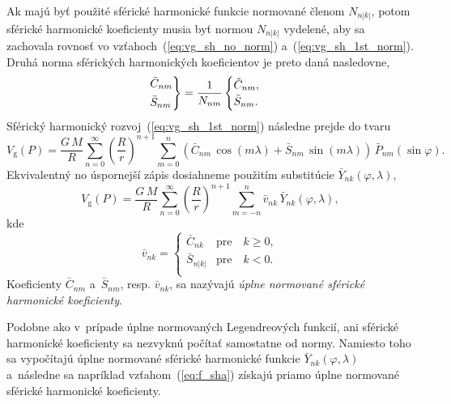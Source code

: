 \documentclass[a4paper, 12pt]{book}
\newcommand{\gidx}{\mathrm g}
\begin{document}
Ak majú byť použité sférické harmonické funkcie normované členom $N_{n|k|}$, 
potom sférické harmonické koeficienty musia byť normou $N_{n|k|}$ vydelené, aby 
sa zachovala rovnosť vo vzťahoch~(\ref{eq:vg_sh_no_norm}) 
a~(\ref{eq:vg_sh_1st_norm}).  Druhá norma sférických harmonických koeficientov 
je preto daná nasledovne,
%
\begin{equation}
\begin{rcases}
\bar{C}_{nm}\\
\bar{S}_{nm}
\end{rcases}
= \frac{1}{N_{nm}}
\begin{cases}
\tilde{C}_{nm}{,}\\
\tilde{S}_{nm}{.}
\end{cases}
\end{equation}
%
Sférický harmonický rozvoj~(\ref{eq:vg_sh_1st_norm}) následne prejde do tvaru
%
\begin{equation}
\label{eq:vg_sh_2nd_norm}
V_\gidx(P) = \frac{G \, M}{R} \sum_{n = 0}^\infty \left( \frac{R}{r} \right)^{n 
+ 1} \sum_{m = 0}^{n} \left( \bar{C}_{nm} \, \cos(m\lambda) + \bar{S}_{nm} \, 
\sin(m\lambda)\right) \, \bar{P}_{nm}(\sin\varphi){.}
\end{equation}
%
Ekvivalentný no úspornejší zápis dosiahneme použitím substitúcie 
$\bar{Y}_{nk}(\varphi, \lambda)$,
%
\begin{equation}
\label{eq:vg_sh_2nd_norm_ynk}
V_\gidx(P) = \frac{G \, M}{R} \sum_{n = 0}^\infty \left( \frac{R}{r} \right)^{n 
+ 1} \sum_{m = -n}^{n} \bar{v}_{nk} \, \bar{Y}_{nk}(\varphi, \lambda){,}
\end{equation}
kde
%
\begin{equation}
\bar{v}_{nk} =
%
\begin{cases}
\bar{C}_{nk}  &\text{pre} \quad k \geq 0{,}\\
\bar{S}_{n|k|}  &\text{pre} \quad k < 0{.}\\
\end{cases}
\end{equation}
%
Koeficienty $\bar{C}_{nm}$ a~$\bar{S}_{nm}$, resp. $\bar{v}_{nk}$, sa nazývajú 
\emph{úplne normované sférické harmonické koeficienty}.

Podobne ako v~prípade úplne normovaných Legendreových funkcií, ani sférické 
harmonické koeficienty sa nezvyknú počítať samostatne od normy.  Namiesto toho 
sa vypočítajú úplne normované sférické harmonické funkcie 
$\bar{Y}_{nk}(\varphi, \lambda)$ a~následne sa napríklad 
vzťahom~(\ref{eq:f_sha}) získajú priamo úplne normované sférické harmonické 
koeficienty.
\end{document}
